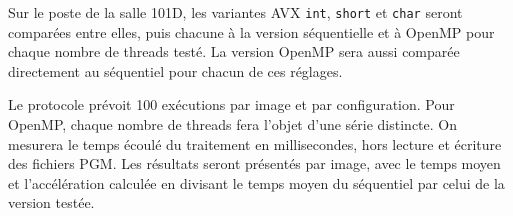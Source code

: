Sur le poste de la salle 101D, les variantes AVX \texttt{int}, \texttt{short} et \texttt{char} seront comparées entre elles, puis chacune à la version séquentielle et à OpenMP pour chaque nombre de threads testé. La version OpenMP sera aussi comparée directement au séquentiel pour chacun de ces réglages.

Le protocole prévoit 100 exécutions par image et par configuration. Pour OpenMP, chaque nombre de threads fera l'objet d'une série distincte. On mesurera le temps écoulé du traitement en millisecondes, hors lecture et écriture des fichiers PGM. Les résultats seront présentés par image, avec le temps moyen et l'accélération calculée en divisant le temps moyen du séquentiel par celui de la version testée.
